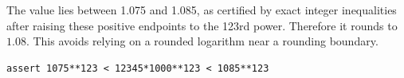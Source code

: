 The value lies between 1.075 and 1.085, as certified by exact integer inequalities after raising these positive endpoints to the 123rd power. Therefore it rounds to $\boxed{1.08}$. This avoids relying on a rounded logarithm near a rounding boundary.
\begin{verbatim}
assert 1075**123 < 12345*1000**123 < 1085**123
\end{verbatim}
